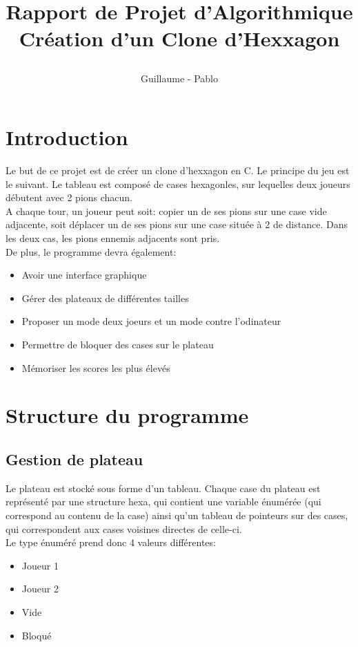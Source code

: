 \documentclass{report}
\begin{document}
\title{%
    \begin{minipage}\linewidth
        \centering
        Rapport de Projet d'Algorithmique
        \vskip 3pt
        \large Création d'un Clone d'Hexxagon
    \end{minipage}
}
\author{Guillaume  - Pablo }
\maketitle

\section{Introduction}

Le but de ce projet est de créer un clone d'hexxagon en C. Le principe du jeu est le suivant. Le tableau est composé de cases hexagonles, sur lequelles deux joueurs débutent avec 2 pions chacun.\\

A chaque tour, un joueur peut soit: copier un de ses pions sur une case vide adjacente, soit déplacer un de ses pions sur une case située à 2 de distance. Dans les deux cas, les pions ennemis adjacents sont pris.\\

De plus, le programme devra également: \begin{itemize}
\item Avoir une interface graphique
\item Gérer des plateaux de différentes tailles
\item Proposer un mode deux joeurs et un mode contre l'odinateur
\item Permettre de bloquer des cases sur le plateau 
\item Mémoriser les scores les plus élevés
\end {itemize}
\newpage
	
\section{Structure du programme}

	\subsection{Gestion de plateau}
		Le plateau est stocké sous forme d'un tableau.
		Chaque case du plateau est représenté par une structure hexa, qui contient une variable énumérée (qui correspond au contenu de la case) ainsi qu'un tableau de pointeurs sur des cases, qui correspondent aux cases voisines directes de celle-ci.\\
		Le type énuméré prend donc 4 valeurs différentes: 	\begin{itemize}
									\item Joueur 1
								  	\item Joueur 2
								  	\item Vide
								  	\item Bloqué
								  	\end{itemize}
	
\end{document}
